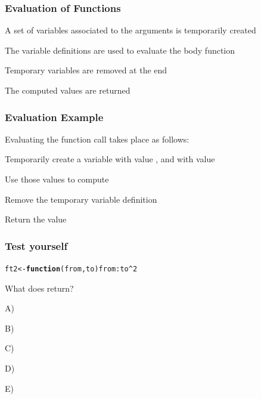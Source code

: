 \documentclass[12pt]{beamer}\usepackage[]{graphicx}\usepackage[]{color}
\makeatletter
\newcommand{\hlnum}[1]{\textcolor[rgb]{0.686,0.059,0.569}{#1}}%
\newcommand{\hlopt}[1]{\textcolor[rgb]{0,0,0}{#1}}%
\newcommand{\hlstd}[1]{\textcolor[rgb]{0.345,0.345,0.345}{#1}}%
\newcommand{\hlkwa}[1]{\textcolor[rgb]{0.161,0.373,0.58}{\textbf{#1}}}%
\newcommand{\hlkwb}[1]{\textcolor[rgb]{0.69,0.353,0.396}{#1}}%
\newcommand{\hlkwc}[1]{\textcolor[rgb]{0.333,0.667,0.333}{#1}}%
\newenvironment{kframe}{%
 \def\at@end@of@kframe{}%
 \ifinner\ifhmode%
  \def\at@end@of@kframe{\end{minipage}}%
  \begin{minipage}{\columnwidth}%
 \fi\fi%
 \def\FrameCommand##1{\hskip\@totalleftmargin \hskip-\fboxsep
 \colorbox{shadecolor}{##1}\hskip-\fboxsep
     \hskip-\linewidth \hskip-\@totalleftmargin \hskip\columnwidth}%
 \MakeFramed {\advance\hsize-\width
   \@totalleftmargin\z@ \linewidth\hsize
   \@setminipage}}%
 {\par\unskip\endMakeFramed%
 \at@end@of@kframe}
\newenvironment{knitrout}{}{} %
\makeatother
\begin{document}

\begin{frame}
\frametitle{Evaluation of Functions}

\bi
  \item A set of variables associated to the arguments is temporarily created
  \item The variable definitions are used to evaluate the body function
  \item Temporary variables are removed at the end
  \item The computed values are returned
\ei
\eb

\end{frame}


\begin{frame}
\frametitle{Evaluation Example}

Evaluating the function call {\hilit {}} takes place as follows:
\bi
  \item Temporarily create a variable {\hilit {}} with value , and {\hilit {}} with value 
  \item Use those values to compute {\hilit {}}
  \item Remove the temporary variable definition
  \item Return the value {\hilit {}}
\ei

\end{frame}


\begin{frame}[fragile]
\frametitle{Test yourself}

\begin{knitrout}
\color{fgcolor}\begin{kframe}
\begin{alltt}
\hlstd{ft2} \hlkwb{<-} \hlkwa{function}\hlstd{(}\hlkwc{from}\hlstd{,} \hlkwc{to}\hlstd{) from}\hlopt{:}\hlstd{to}\hlopt{^}\hlnum{2}
\end{alltt}
\end{kframe}
\end{knitrout}

What does {\hilit {}} return?

\bi
  \item[A)] 
  \item[B)] 
  \item[C)] 
  \item[D)] 
  \item[E)] 
\ei

\end{frame}
\end{document}
